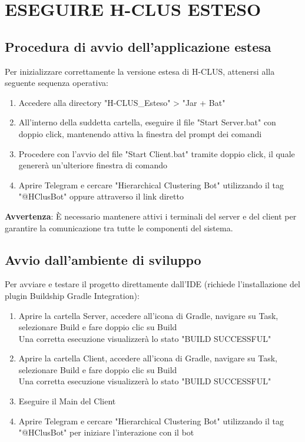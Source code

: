 \section{ESEGUIRE H-CLUS ESTESO}

\subsection{Procedura di avvio dell'applicazione estesa}

Per inizializzare correttamente la versione estesa di H-CLUS, attenersi alla seguente sequenza operativa:

\begin{enumerate}
    \item Accedere alla directory "H-CLUS\_Esteso" > "Jar + Bat"
    \item All'interno della suddetta cartella, eseguire il file "Start Server.bat" con doppio click, mantenendo attiva la finestra del prompt dei comandi
    \item Procedere con l'avvio del file "Start Client.bat" tramite doppio click, il quale genererà un'ulteriore finestra di comando
    \item Aprire Telegram e cercare "Hierarchical Clustering Bot" utilizzando il tag "@HClusBot" oppure attraverso il link diretto
\end{enumerate}

\textbf{Avvertenza}: È necessario mantenere attivi i terminali del server e del client per garantire la comunicazione tra tutte le componenti del sistema.

\subsection{Avvio dall'ambiente di sviluppo}

Per avviare e testare il progetto direttamente dall'IDE (richiede l'installazione del plugin Buildship Gradle Integration):

\begin{enumerate}
    \item Aprire la cartella Server, accedere all'icona di Gradle, navigare su Task, selezionare Build e fare doppio clic su Build\\
    Una corretta esecuzione visualizzerà lo stato "BUILD SUCCESSFUL"
    
    \item Aprire la cartella Client, accedere all'icona di Gradle, navigare su Task, selezionare Build e fare doppio clic su Build\\
    Una corretta esecuzione visualizzerà lo stato "BUILD SUCCESSFUL"
    
    \item Eseguire il Main del Client
    
    \item Aprire Telegram e cercare "Hierarchical Clustering Bot" utilizzando il tag "@HClusBot" per iniziare l'interazione con il bot
\end{enumerate}

